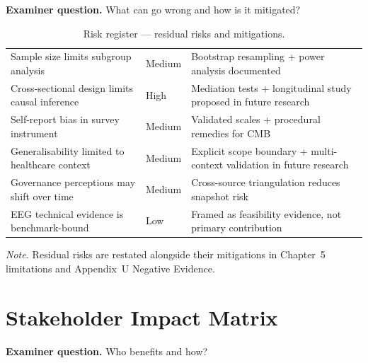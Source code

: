 \noindent\textbf{Examiner question.} What can go wrong and how is it mitigated?

{\tablestripes\tablefontsize
{}
\begin{xltabular}{\textwidth}{@{} >{\raggedright\arraybackslash}p{4.2cm} >{\raggedright\arraybackslash}p{1.7cm} L @{}}
\caption[Risk register]{Risk register --- residual risks and mitigations.}\label{tab:dist_risk_register} \\
\toprule
{} &  &  \\
\midrule
\endfirsthead
\endhead
\bottomrule
\endlastfoot
Sample size limits subgroup analysis & Medium & Bootstrap resampling + power analysis documented \\
\addlinespace
Cross-sectional design limits causal inference & High & Mediation tests + longitudinal study proposed in future research \\
\addlinespace
Self-report bias in survey instrument & Medium & Validated scales + procedural remedies for CMB \\
\addlinespace
Generalisability limited to healthcare context & Medium & Explicit scope boundary + multi-context validation in future research \\
\addlinespace
Governance perceptions may shift over time & Medium & Cross-source triangulation reduces snapshot risk \\
\addlinespace
EEG technical evidence is benchmark-bound & Low & Framed as feasibility evidence, not primary contribution \\
\end{xltabular}}

\vspace{0.3em}\noindent\textit{Note.} Residual risks are restated alongside their mitigations in Chapter~5 limitations and Appendix~U Negative Evidence.


\section{Stakeholder Impact Matrix}
\label{app:distinction_stakeholder_matrix}

\noindent\textbf{Examiner question.} Who benefits and how?

